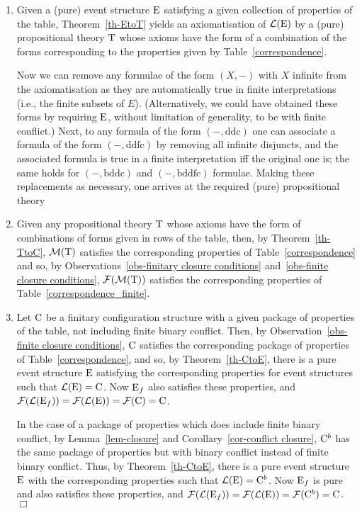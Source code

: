 \documentclass[twocolumn]{article}
\newcommand{\thm}[1]{Theorem~\ref{th-#1}}
\newcommand{\lem}[1]{Lemma~\ref{lem-#1}}
\newcommand{\cor}[1]{Corollary~\ref{cor-#1}}
\newcommand{\ob}[1]{Observation~\ref{obs-#1}}
\begin{document}
\begin{enumerate}
\item 
Given a (pure) event structure ${\rm E}$
satisfying a given collection of properties of the table, 
Theorem~\ref{th-EtoT} yields an axiomatisation of 
${\cal L}({\rm E})$ by a (pure) propositional theory ${\rm T}$ whose axioms have 
the form of a combination of the forms corresponding to
the  properties given by Table~\ref{correspondence}.

Now we can remove any formulae of the form $(X, - )$ with $X$ infinite
from the axiomatisation as they are automatically true in finite
interpretations (i.e., the finite subsets of $E$).  (Alternatively, we
could have obtained these forms by requiring ${\rm E}$, without limitation
of generality, to be with finite conflict.)  Next, to any formula of
the form $(-,\mbox{ddc})$ one can associate a formula of the form
$(-,\mbox{ddfc})$ by removing all infinite disjuncts, and the
associated formula is true in a finite interpretation iff the original
one is; the same holds for $(-,\mbox{bddc})$ and $(-,\mbox{bddfc})$
formulae. Making these replacements as necessary, one arrives at the
required (pure) propositional theory

\item 
Given any propositional theory ${\rm T}$ whose axioms have the form of
combinations of forms given in rows of the table, then, by \thm{TtoC},
${\cal M}({\rm T})$ satisfies the corresponding properties of
Table~\ref{correspondence} and so, by Observations~\ref{obs-finitary
closure conditions} and~\ref{obs-finite closure conditions},
${\cal F}({\cal M}({\rm T}))$ satisfies the corresponding properties of
Table~\ref{correspondence_finite}.

\item 
Let ${\rm C}$ be a finitary configuration structure with a given package
of properties of the table, not including finite binary conflict.
Then,  by \ob{finite closure conditions}, ${\rm C}$ satisfies the
corresponding package of properties of Table~\ref{correspondence},
and so, by \thm{CtoE}, there is a pure  event structure ${\rm E}$ satisfying 
the corresponding properties for event structures such that 
${\cal L}({\rm E}) = {\rm C}$.
Now ${\rm E}_f$ also satisfies these properties, and
${\cal F}({\cal L}({\rm E}_f)) = {\cal F}({\cal L}({\rm E})) = {\cal F}({\rm C}) = {\rm C}$.

In the case of a package of properties which does include finite
binary conflict, by \lem{closure} and \cor{conflict closure}, ${\rm C}^b$
has the same package of properties but with binary conflict instead of
finite binary conflict. Thus, by \thm{CtoE}, there is a pure event
structure ${\rm E}$ with the corresponding properties such that
${\cal L}({\rm E})={\rm C}^b$.  Now ${\rm E}_f$ is pure and also satisfies these properties, and
${\cal F}({\cal L}({\rm E}_f)) = {\cal F}({\cal L}({\rm E})) = {\cal F}({\rm C}^b) = {\rm C}$.
\hfill$\Box$
\end{enumerate}
\end{document}

